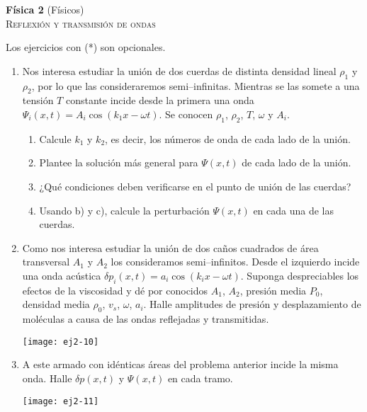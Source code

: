 \documentclass[11pt,spanish,a4paper]{article}
\begin{document}
\begin{center}
\textbf{Física 2} (Físicos) \hfill {}\\
	\textsc{\LARGE Reflexión y transmisión de ondas}
\end{center}

Los ejercicios con (*) son opcionales.

\begin{enumerate}

\item Nos interesa estudiar la unión de dos cuerdas de distinta densidad lineal $\rho_1$ y $\rho_2$, por lo que las consideraremos semi--infinitas. 
Mientras se las somete a una tensión $T$ constante incide desde la primera una onda $\Psi_i(x,t) = A_i \cos{ \left( k_{1} x- \omega t \right) }$.
Se conocen $\rho_{1}$, $\rho_{2}$, $T$, $\omega$ y $A_{i}$.
\begin{enumerate}
	\item Calcule $k_{1}$ y $k_{2}$, es decir, los números de onda de cada lado de la unión.
	\item Plantee la solución más general para $\Psi(x,t)$ de cada lado de la unión.
	\item ¿Qué condiciones deben verificarse en el punto de unión de las cuerdas?
	\item Usando b) y c), calcule la perturbación $\Psi(x,t)$ en cada una de las cuerdas.
\end{enumerate}


\item
\begin{minipage}[t][3.3cm]{0.6\textwidth}
Como nos interesa estudiar la unión de dos caños cuadrados de área transversal $A_1$ y $A_2$ los consideramos semi--infinitos.
Desde el izquierdo incide una onda acústica $\delta p_i (x,t) = a_i \cos{ \left( k_i x - \omega t \right) }$.
Suponga despreciables los efectos de la viscosidad y dé por conocidos $A_{1}$, $A_{2}$, presión media $P_{0}$, densidad media $\rho_{0}$, $v_{s}$, $\omega$, $a_i$.
Halle amplitudes de presión y desplazamiento de moléculas a causa de las ondas reflejadas y transmitidas.
\end{minipage}
\begin{minipage}[c][0cm][t]{0.34\textwidth}
	\texttt{[image: ej2-10]}
\end{minipage}


\item 
\begin{minipage}[t][1.6cm]{0.6\textwidth}
A este armado con idénticas áreas del problema anterior incide la misma onda.
Halle $\delta p(x,t)$ y $\Psi(x,t)$ en cada tramo.
\end{minipage}
\begin{minipage}[c][1cm][t]{0.34\textwidth}
	\texttt{[image: ej2-11]}
\end{minipage}



\end{enumerate}
\end{document}
